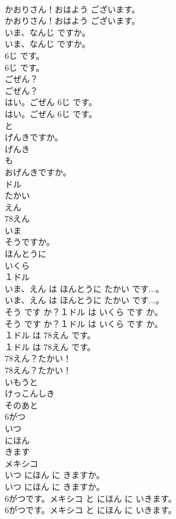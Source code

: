 \documentclass[8pt]{extreport}
\begin{document}
\begin{CJK}{UTF8}{min}
\\	かおりさん！おはよう ございます。	
\\	かおりさん！おはよう ございます。 
\\	いま、なんじ ですか。	
\\	いま、なんじ ですか。 
\\	6じ です。	
\\	6じ です。 
\\	ごぜん？	
\\	ごぜん？ 
\\	はい。ごぜん 6じ です。	
\\	はい。ごぜん 6じ です。 
\\	と
\\	げんきですか。
\\	げんき
\\	も
\\	おげんきですか。
\\	ドル
\\	たかい
\\	えん
\\	78えん
\\	いま
\\	そうですか。
\\	ほんとうに
\\	いくら
\\	１ドル
\\	いま、えん は ほんとうに たかい です...。	
\\	いま、えん は ほんとうに たかい です...。 
\\	そう です か？１ドル は いくら です か。	
\\	そう です か？１ドル は いくら です か。 
\\	１ドル は 78えん です。	
\\	１ドル は 78えん です。 
\\	78えん？たかい！	
\\	78えん？たかい！ 
\\	いもうと
\\	けっこんしき
\\	そのあと
\\	6がつ
\\	いつ
\\	にほん
\\	きます
\\	メキシコ
\\	いつ にほん に きますか。	
\\	いつ にほん に きますか。 
\\	6がつです。メキシコ と にほん に いきます。	
\\	6がつです。メキシコ と にほん に いきます。 

\end{CJK}
\end{document}
